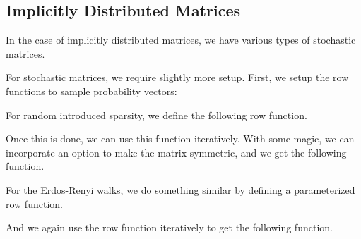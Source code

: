 \subsection{Implicitly Distributed Matrices}

In the case of implicitly distributed matrices, we have various types of stochastic matrices.


For stochastic matrices, we require slightly more setup. First, we setup the row functions to sample probability vectors:


For random introduced sparsity, we define the following row function.


Once this is done, we can use this function iteratively. With some magic, we can incorporate an option to make the matrix symmetric, and we get the following function.


\newpage
{}

For the Erdos-Renyi walks, we do something similar by defining a parameterized row function.


And we again use the row function iteratively to get the following function.


